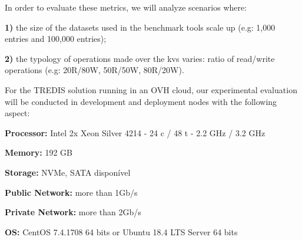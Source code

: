 In order to evaluate these metrics, we will analyze scenarios where:

\textbf{1)} the size of the datasets used in the benchmark tools scale up (e.g: 1,000 entries and 100,000 entries);

\textbf{2)} the typology of operations made over the \gls{kvs} varies: ratio of read/write operations (e.g: 20R/80W, 50R/50W, 80R/20W).


For the TREDIS solution running in an OVH cloud, our experimental evaluation will be conducted in development and deployment nodes with the following aspect:

\textbf{Processor:} Intel 2x Xeon Silver 4214 - 24 c / 48 t - 2.2 GHz / 3.2 GHz

\textbf{Memory:} 192 GB

\textbf{Storage:} NVMe, SATA disponível

\textbf{Public Network:} more than 1Gb/s

\textbf{Private Network:} more than 2Gb/s

\textbf{OS:} CentOS 7.4.1708 64 bits or Ubuntu 18.4 LTS Server 64 bits



% 
% 
% 
% 



